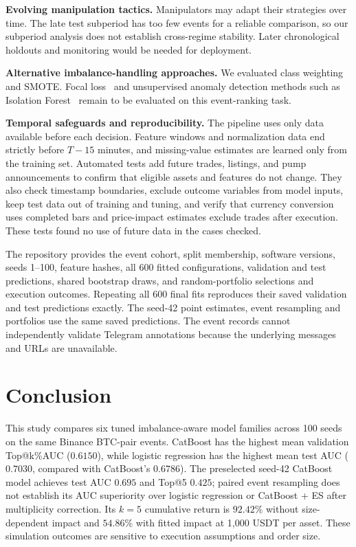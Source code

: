\documentclass{ieeeaccess}
\begin{document}
\textbf{Evolving manipulation tactics.}
Manipulators may adapt their strategies over time. The late test subperiod has too few events for a reliable comparison, so our subperiod analysis does not establish cross-regime stability. Later chronological holdouts and monitoring would be needed for deployment.

\textbf{Alternative imbalance-handling approaches.}
We evaluated class weighting~\cite{elkan2001cost} and SMOTE. Focal loss~\cite{lin2017focal} and unsupervised anomaly detection methods such as Isolation Forest~\cite{liu2008isolation} remain to be evaluated on this event-ranking task.

\textbf{Temporal safeguards and reproducibility.}
The pipeline uses only data available before each decision. Feature windows and normalization data end strictly before $T-15$ minutes, and missing-value estimates are learned only from the training set. Automated tests add future trades, listings, and pump announcements to confirm that eligible assets and features do not change. They also check timestamp boundaries, exclude outcome variables from model inputs, keep test data out of training and tuning, and verify that currency conversion uses completed bars and price-impact estimates exclude trades after execution. These tests found no use of future data in the cases checked.

The repository provides the event cohort, split membership, software versions, seeds 1--100, feature hashes, all 600 fitted configurations, validation and test predictions, shared bootstrap draws, and random-portfolio selections and execution outcomes. Repeating all 600 final fits reproduces their saved validation and test predictions exactly. The seed-42 point estimates, event resampling and portfolios use the same saved predictions. The event records cannot independently validate Telegram annotations because the underlying messages and URLs are unavailable.


\FloatBarrier %
\section{Conclusion}

This study compares six tuned imbalance-aware model families across 100 seeds on the same Binance BTC-pair events. CatBoost has the highest mean validation Top@k\%AUC ($0.6150$), while logistic regression has the highest mean test AUC ($0.7030$, compared with CatBoost's $0.6786$). The preselected seed-42 CatBoost model achieves test AUC $0.695$ and Top@5 $0.425$; paired event resampling does not establish its AUC superiority over logistic regression or CatBoost + ES after multiplicity correction. Its $k=5$ cumulative return is $92.42\%$ without size-dependent impact and $54.86\%$ with fitted impact at 1{,}000 USDT per asset. These simulation outcomes are sensitive to execution assumptions and order size.
\end{document}
